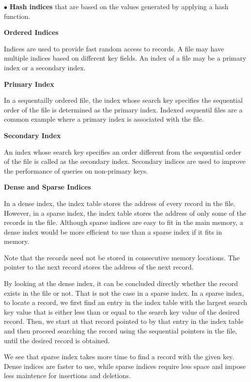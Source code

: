 \vskip 3mm
\qquad$\bullet$ {\bf Hash indices} that are based on the values generated by applying a hash function.

\filbreak
\vskip 1cm
{\bf Ordered Indices}

\vskip 1mm
Indices are used to provide fast random access to records. A file may have multiple indices based on different key fields. An index of a file may be a primary index or a secondary index.

\vskip 3mm
{\bf Primary Index}

\vskip 1mm
In a sequentailly ordered file, the index whose search key specifies the sequential order of the file is determined as the primary index. Indexed sequentil files are a common example where a primary index is associated with the file.

\vskip 3mm
{\bf Secondary Index}

\vskip 1mm
An index whose search key specifies an order different from the sequential order of the file is called as the secondary index. Secondary indices are used to improve the performance of queries on non-primary keys.

\filbreak
\vskip 1cm
{\bf Dense and Sparse Indices}

\vskip 1mm
In a dense index, the index table stores the address of every record in the file. However, in a sparse index, the index table stores the address of only some of the records in the file. Although sparse indices are easy to fit in the main memory, a dense index would be more efficient to use than a sparse index if it fits in memory.

\vskip 1mm
Note that the records need not be stored in consecutive memory locations. The pointer to the next record stores the address of the next record.

\vskip 1mm
By looking at the dense index, it can be concluded directly whether the record exists in the file or not. That is not the case in a sparse index. In a sparse index, to locate a record, we first find an entry in the index table with the largest search key value that is either less than or equal to the search key value of the desired record. Then, we start at that record pointed to by that entry in the index table and then proceed searching the record using the sequential pointers in the file, until the desired record is obtained.

\vskip 1mm
We see that sparse index takes more time to find a record with the given key. Dense indices are faster to use, while sparse indices require less space and impose less maintence for insertions and deletions.

